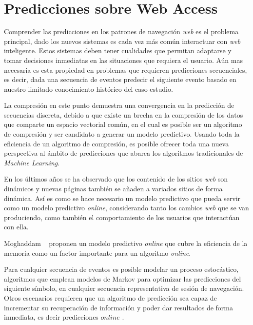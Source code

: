 \chapter[Predicciones sobre Web Access]{Predicciones sobre Web Access} 
\label{ch:predicciones-webaccess}

Comprender las predicciones en los patrones de navegación \emph{web} es el problema principal, dado los nuevos sistemas es cada vez más común interactuar con \emph{web} inteligente. Estos sistemas deben tener cualidades que permitan adaptarse y tomar decisiones inmediatas en las situaciones que requiera el usuario. Aún mas necesaria es esta propiedad en problemas que requieren predicciones secuenciales, es decir, dada una secuencia de eventos  predecir el siguiente evento basado en nuestro limitado conocimiento histórico del caso estudio.

La compresión en este punto demuestra una convergencia en la predicción de secuencias discreta, debido a que existe un brecha en la compresión de los datos que comparte un espacio vectorial común, en el cual es posible ser un  algoritmo de compresión y ser candidato a generar un modelo predictivo. Usando toda la eficiencia de un algoritmo de compresión, es posible ofrecer toda una nueva perspectiva al ámbito de  predicciones que abarca los algoritmos tradicionales de \emph{Machine Learning}. 

En los últimos años se ha observado que  los contenido de los sitios \emph{web} son dinámicos y nuevas páginas también se añaden a variados sitios de forma dinámica. Así es como  se hace necesario un modelo predictivo que pueda servir como un modelo predictivo \emph{online},  considerando tanto los cambios \emph{web} que se van produciendo, como también el comportamiento de los usuarios que interactúan con ella. 

Moghaddam \etal~\cite{Moghaddam2009} proponen un modelo predictivo \emph{online} que cubre la eficiencia de la memoria como un factor importante para un algoritmo \emph{online}. 

Para cualquier secuencia de eventos es posible modelar un proceso estocástico, algoritmos que emplean modelos de Markov para optimizar las predicciones del siguiente símbolo, en cualquier secuencia representativa  de sesión de navegación. Otros escenarios requieren que un algoritmo de predicción sea capaz de incrementar su recuperación de información  y poder dar resultados de forma inmediata, es decir predicciones $online$ .

